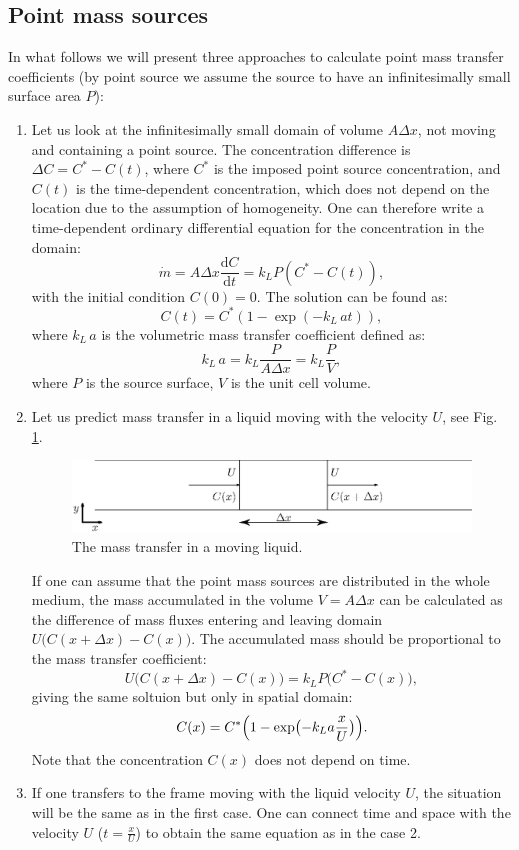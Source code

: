 \documentclass{article}
\newcommand{\beq}{\begin{equation}}
\newcommand{\feq}{\end{equation}}
\newcommand{\vol}{k_L\,a}
\newcommand{\cstar}{C^{*}}
\begin{document}
\subsection{Point mass sources}
In what follows we will present three approaches to calculate point  mass transfer
coefficients (by point source we assume the source to have an infinitesimally small surface area $P$):
\begin{enumerate}
\item
Let us look at the infinitesimally small domain of volume $A \Delta x$, not
moving and containing a point source.  The concentration difference is $\Delta C =
\cstar -
C(t)$, where $\cstar$ is the imposed point source concentration, and $C(t)$ is
the time-dependent concentration, which does not depend on the location due to the assumption of
homogeneity. One can therefore write a time-dependent ordinary differential equation for the
concentration in the domain:
\beq
\dot{m}= A \Delta x \frac{\mathrm{d}C}{\mathrm{d} t} = k_L P (\cstar-C(t)), 
\feq
with the initial condition $C(0)=0$.
The solution can be found as:
\beq
C(t)= \cstar (1-\exp(-\vol t )), 
\feq
where $\vol$ is the volumetric mass transfer coefficient defined as:
\beq
\vol=k_L \frac{P}{A \Delta x}=k_L \frac{P}{V},
\feq
where $P$ is the source surface, $V$ is the unit cell volume.
\item
Let us predict mass transfer in a liquid moving with the velocity
$U$, see Fig. \ref{fig:moving:frame}. 
\begin{figure}[htb!]
\includegraphics[width=\textwidth]{Figures/mass_transfer.eps}
\caption{The mass transfer in a moving liquid. \label{fig:moving:frame}}
\end{figure}

If one can assume that the point mass sources are distributed in the whole
medium, the mass accumulated in the volume $V=A \Delta x$ can be
calculated as the difference of mass fluxes entering and leaving domain $U
\bigl(C(x+\Delta x)-C(x)\bigr)$. The accumulated mass should be proportional to
the mass transfer coefficient:
\beq
U \bigl(C(x+\Delta x)-C(x)\bigr)=k_L P \bigl(\cstar-C(x)\bigr), 
\feq 
giving the same soltuion but only in spatial domain:
\beq
C(x)= \cstar \Bigl(1-\exp\bigl(-k_L a \frac{x}{U} \bigr)\Bigr).
\label{main:mass:transfer:expression} 
\feq
Note that the concentration $C(x)$ does not depend on time. 

\item If one transfers to the frame moving with the liquid velocity $U$, the situation will be
the same as in the first case. One can connect  time and space with the
velocity $U$ ($t=\frac{x}{U}$) to obtain the same equation as in the case 2.
\end{enumerate}
\end{document}
